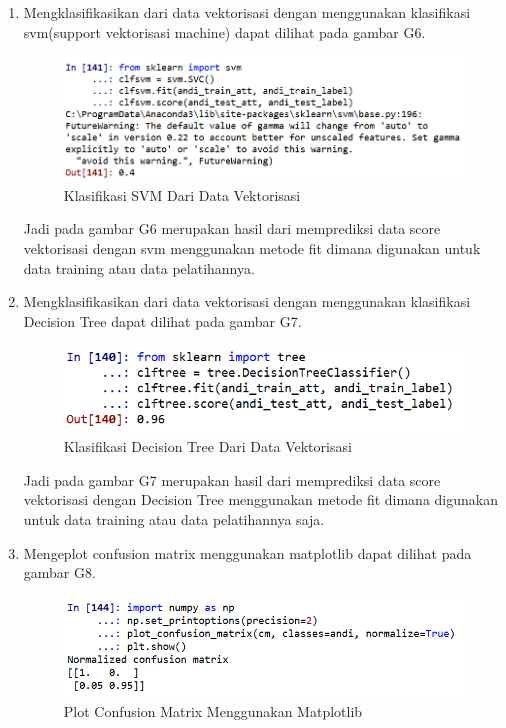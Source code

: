 \begin{enumerate}
\item Mengklasifikasikan dari data vektorisasi dengan menggunakan klasifikasi svm(support vektorisasi machine) dapat dilihat pada  gambar G6.
\begin{figure}[ht]
	\centerline{\includegraphics[width=1\textwidth]{figures/andi/G6.PNG}}
	\caption{Klasifikasi SVM Dari Data Vektorisasi}
	\label{Contoh Ilustrasi}
\end{figure}

\subitem Jadi pada gambar G6 merupakan hasil dari memprediksi data score vektorisasi dengan svm menggunakan metode fit dimana digunakan untuk data training atau data pelatihannya.
\item Mengklasifikasikan dari data vektorisasi dengan menggunakan klasifikasi Decision Tree dapat dilihat pada gambar G7.
\begin{figure}[ht]
	\centerline{\includegraphics[width=1\textwidth]{figures/andi/G7.PNG}}
	\caption{Klasifikasi Decision Tree Dari Data Vektorisasi}
	\label{Contoh Ilustrasi}
\end{figure}

\subitem Jadi pada gambar G7 merupakan hasil dari memprediksi data score vektorisasi dengan Decision Tree menggunakan metode fit dimana digunakan untuk data training atau data pelatihannya saja.
\item Mengeplot confusion matrix menggunakan matplotlib dapat dilihat pada gambar G8.
\begin{figure}[ht]
	\centerline{\includegraphics[width=1\textwidth]{figures/andi/G8.PNG}}
	\caption{Plot Confusion Matrix Menggunakan Matplotlib}
	\label{Contoh Ilustrasi}
\end{figure}


\end{enumerate}
